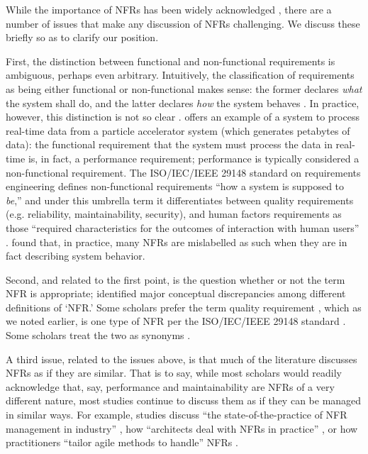 \documentclass[smallextended]{svjour3}        %
\begin{document}
While the importance of NFRs has been widely acknowledged \citep{glinz_non-functional_2007,mairiza2010investigation,borg2003bad}, there are a number of issues that make any discussion of NFRs challenging. We discuss these briefly so as to clarify our position.

First, the distinction between functional and non-functional requirements is ambiguous, perhaps even arbitrary. Intuitively, the classification of requirements as being either functional or non-functional makes sense: the former declares \textit{what} the system shall do, and the latter declares \textit{how} the system behaves \citep[p. 328]{eckhardt2016non,dorfman1990standards}. In practice, however, this distinction is not so clear \citep{eckhardt2016non}. \cite{glinz_non-functional_2007} offers an example of a system to process real-time data from a particle accelerator system (which generates petabytes of data): the functional requirement that the system must process the data in real-time is, in fact, a performance requirement; performance is typically considered a non-functional requirement.
The ISO/IEC/IEEE 29148 standard on requirements engineering defines non-functional requirements ``how a system is supposed to \textit{be},'' and under this umbrella term it differentiates between quality requirements (e.g. reliability, maintainability, security), and human factors requirements as those ``required characteristics for the outcomes of interaction with human users'' \cite[p. 14]{restandard}. 
\citet{eckhardt2016non} found that, in practice, many NFRs are mislabelled as such when they are in fact describing system behavior. 


Second, and related to the first point, is the question whether or not the term NFR is appropriate; \cite{glinz_non-functional_2007} identified major conceptual discrepancies among different definitions of `NFR.' 
Some scholars prefer the term quality requirement \citep{pohl2016requirements,svensson2010managing}, which as we noted earlier, is one type of NFR per the ISO/IEC/IEEE 29148 standard \citep{restandard}. 
Some scholars treat the two as synonyms \citep[e.g.][]{capilla2012quality}.

A third issue, related to the issues above, is that much of the literature discusses NFRs as if they are similar. That is to say, while most scholars would readily acknowledge that, say, performance and maintainability are NFRs of a very different nature, most studies continue to discuss them as if they can be managed in similar ways. 
For example, studies discuss ``the state-of-the-practice of NFR management in industry'' \citep{borg2003bad}, how ``architects deal with NFRs in practice'' \citep{ameller_how_2012}, or how practitioners ``tailor agile methods to handle'' NFRs \citep{rahy2022managing}. 
\end{document}
